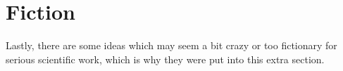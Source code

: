%
%
%
%
%
%
%

\section{Fiction}
\label{fiction_heading}

Lastly, there are some ideas which may seem a bit crazy or too fictionary for
serious scientific work, which is why they were put into this extra section.






%
%
%

